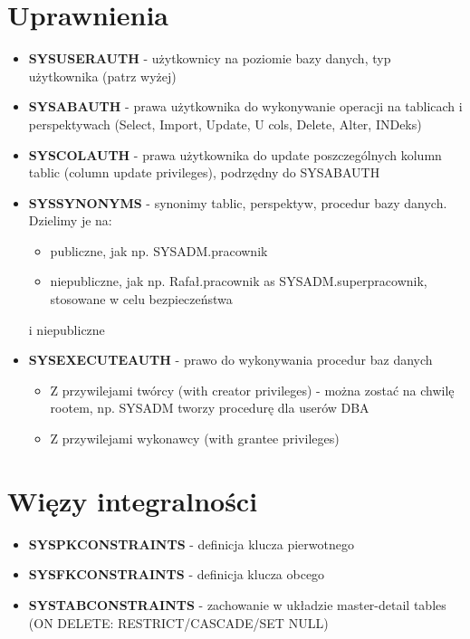 \documentclass[a4paper,twoside]{article}
\begin{document}
  	\section*{Uprawnienia}
  	\begin{itemize}
  		\item \textbf{SYSUSERAUTH} - użytkownicy na poziomie bazy danych, typ użytkownika (patrz wyżej)
  		\item \textbf{SYSABAUTH} - prawa użytkownika do wykonywanie operacji na tablicach i perspektywach (Select, Import, Update, U cols, Delete, Alter, INDeks)
  		\item \textbf{SYSCOLAUTH} - prawa użytkownika do update poszczególnych kolumn tablic (column update privileges), podrzędny do SYSABAUTH
  		\item \textbf{SYSSYNONYMS} - synonimy tablic, perspektyw, procedur bazy danych. Dzielimy je na:
  		\begin{itemize}
  			\item publiczne, jak np. SYSADM.pracownik
  			\item niepubliczne, jak np. Rafał.pracownik as SYSADM.superpracownik, stosowane w celu bezpieczeństwa
  		\end{itemize} i niepubliczne
  		\item \textbf{SYSEXECUTEAUTH} - prawo do wykonywania procedur baz danych
  		\begin{itemize}
  			\item Z przywilejami twórcy (with creator privileges) - można zostać na chwilę rootem, np. SYSADM tworzy procedurę dla userów DBA
  			\item Z przywilejami wykonawcy (with grantee privileges)
  		\end{itemize}
  	\end{itemize}
  	\section*{Więzy integralności}
  	\begin{itemize}
  		\item \textbf{SYSPKCONSTRAINTS} - definicja klucza pierwotnego
  		\item \textbf{SYSFKCONSTRAINTS} - definicja klucza obcego
  		\item \textbf{SYSTABCONSTRAINTS} - zachowanie w układzie master-detail tables (ON DELETE: RESTRICT/CASCADE/SET NULL)
  	\end{itemize}
\end{document}
